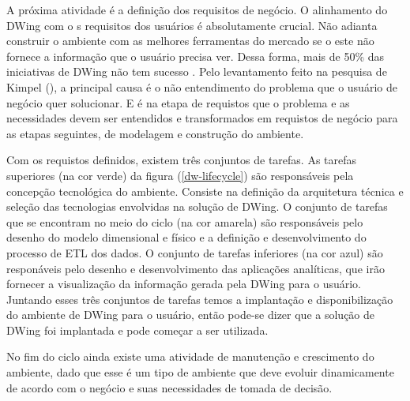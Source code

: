 A próxima atividade é a definição dos requisitos de negócio. O alinhamento do DWing com o s requisitos dos usuários é absolutamente crucial. Não adianta construir o ambiente com as melhores ferramentas do mercado se o este não fornece a informação que o usuário precisa ver. Dessa forma, mais de 50\% das iniciativas de DWing não tem sucesso \cite{sen2011}. Pelo levantamento feito na pesquisa de Kimpel (\citeyear{kimpel2013}), a principal causa é o não entendimento do problema que o usuário de negócio quer solucionar. E é na etapa de requistos que o problema e as necessidades devem ser entendidos e transformados em requistos de negócio para as etapas seguintes, de modelagem e construção do ambiente.

%

Com os requistos definidos, existem três conjuntos de tarefas. As tarefas superiores (na cor verde) da figura (\ref{dw-lifecycle}) são responsáveis pela concepção tecnológica do ambiente. Consiste na definição da arquitetura técnica e  seleção das tecnologias envolvidas na solução de DWing. O conjunto de tarefas que se encontram no meio do ciclo (na cor amarela) são responsáveis pelo desenho do modelo dimensional e físico e a definição e desenvolvimento do processo de ETL dos dados. O conjunto de tarefas inferiores (na cor  azul) são responáveis pelo desenho e desenvolvimento das aplicações analíticas, que irão fornecer a visualização da informação gerada pela DWing para o usuário. Juntando esses três conjuntos de tarefas temos a implantação e disponibilização do ambiente de DWing para o usuário, então pode-se dizer que a solução de DWing foi implantada e pode começar a ser utilizada. 

%

No fim do ciclo ainda existe uma atividade de manutenção e crescimento do ambiente, dado que esse é um tipo de ambiente que deve evoluir dinamicamente de acordo com o negócio e suas necessidades de tomada de decisão.

